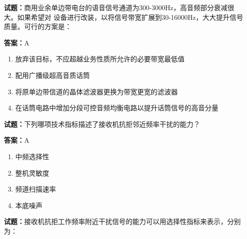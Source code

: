 \documentclass{ctexbook}
\begin{document}




\vspace{1em}

\textbf{试题：}商用业余单边带电台的语音信号通道为300-3000Hz，高音频部分衰减很大。如果希望对
设备进行改装，以将信号带宽扩展到30-16000Hz，大大提升信号质量。可行的方案是： 

\textbf{答案：}A 

\begin{enumerate}[leftmargin=3em]
  \item 放弃该目标，不应超越业务性质所允许的必要带宽最低值 

  \item 配用广播级超高音质话筒 

  \item 将原单边带信道的晶体滤波器更换为带宽更宽的滤波器 

  \item 在话筒电路中增加分段可控音频均衡电路以提升话筒信号的高音分量 

\end{enumerate}





\vspace{1em}

\textbf{试题：}下列哪项技术指标描述了接收机抗拒邻近频率干扰的能力？ 

\textbf{答案：}A 

\begin{enumerate}[leftmargin=3em]
  \item 中频选择性 

  \item 整机灵敏度 

  \item 频道扫描速率 

  \item 本底噪声 

\end{enumerate}





\vspace{1em}

\textbf{试题：}接收机抗拒工作频率附近干扰信号的能力可以用选择性指标来表示，分别为： 
\end{document}
